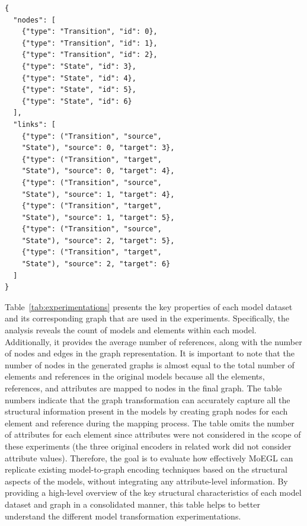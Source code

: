 \documentclass[journal,article,submit,moreauthors,technologies]{Definitions/mdpi}
\begin{document}
\begin{program_}[H]
\footnotesize
\begin{verbatim}
{
  "nodes": [
    {"type": "Transition", "id": 0},
    {"type": "Transition", "id": 1},
    {"type": "Transition", "id": 2},
    {"type": "State", "id": 3},
    {"type": "State", "id": 4},
    {"type": "State", "id": 5},
    {"type": "State", "id": 6}
  ],
  "links": [
    {"type": ("Transition", "source",
    "State"), "source": 0, "target": 3},
    {"type": ("Transition", "target",
    "State"), "source": 0, "target": 4},
    {"type": ("Transition", "source",
    "State"), "source": 1, "target": 4},
    {"type": ("Transition", "target",
    "State"), "source": 1, "target": 5},
    {"type": ("Transition", "source",
    "State"), "source": 2, "target": 5},
    {"type": ("Transition", "target",
    "State"), "source": 2, "target": 6}
  ]
}
\end{verbatim}
\caption{The graph data of the FSM instance model in~\cite{miranda2024towards}.}
\label{Listing:NetworkXJames}
\end{program_}



Table~\ref{tab:experimentations} presents the key properties of each model dataset and its corresponding graph that are used in the experiments. Specifically, the analysis reveals the count of models and elements within each model. Additionally, it provides the average number of references, along with the number of nodes and edges in the graph representation.
It is important to note that the number of nodes in the generated graphs is almost equal to the total number of elements and references in the original models because all the elements, references, and attributes are mapped to nodes in the final graph. The table numbers indicate that the graph transformation can accurately capture all the structural information present in the models by creating graph nodes for each element and reference during the mapping process.
The table omits the number of attributes for each element since attributes were not considered in the scope of these experiments (the three original encoders in related work did not consider attribute values). Therefore, the goal is to evaluate how effectively MoEGL can replicate existing model-to-graph encoding techniques based on the structural aspects of the models, without integrating any attribute-level information.
By providing a high-level overview of the key structural characteristics of each model dataset and graph in a consolidated manner, this table helps to better understand the different model transformation experimentations.
\end{document}
